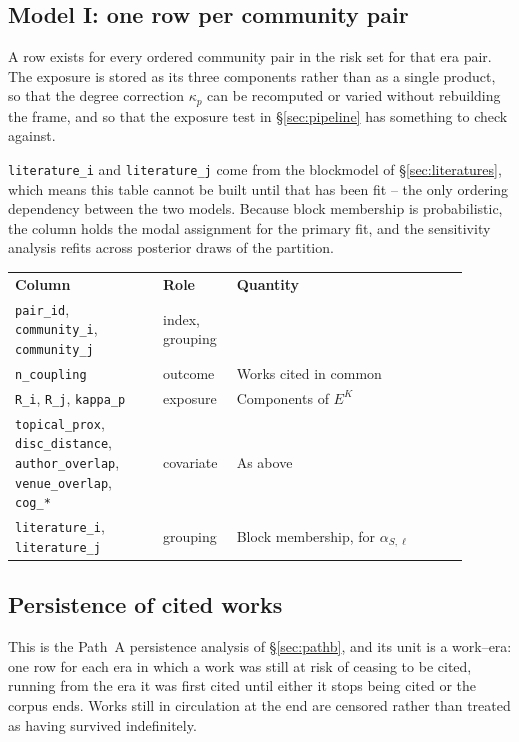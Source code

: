 \documentclass[11pt]{article}
\newcommand{\doublerule}{%
  \specialrule{\lightrulewidth}{0pt}{\doublerulesep}%
  \specialrule{\lightrulewidth}{0pt}{0pt}}
\newcommand{\code}[1]{\texttt{\small #1}}
\begin{document}
\subsection{Model I: one row per community pair}

A row exists for every ordered community pair in the risk set for that era pair. The exposure
is stored as its three components rather than as a single product, so that the degree
correction $\kappa_p$ can be recomputed or varied without rebuilding the frame, and so that
the exposure test in \S\ref{sec:pipeline} has something to check against.

\code{literature\_i} and \code{literature\_j} come from the blockmodel of
\S\ref{sec:literatures}, which means this table cannot be built until that has been fit --
the only ordering dependency between the two models. Because block membership is
probabilistic, the column holds the modal assignment for the primary fit, and the sensitivity
analysis refits across posterior draws of the partition.

\begin{center}
\small
\begin{tabular}{@{}>{\raggedright\arraybackslash}p{0.30\linewidth}>{\raggedright\arraybackslash}p{0.13\linewidth}>{\raggedright\arraybackslash}p{0.47\linewidth}@{}}
\toprule
\textbf{Column} & \textbf{Role} & \textbf{Quantity}\\
\doublerule
\code{pair\_id}, \code{community\_i}, \code{community\_j} & index, grouping & \\
\code{n\_coupling} & outcome & Works cited in common\\
\code{R\_i}, \code{R\_j}, \code{kappa\_p} & exposure & Components of $E^{K}$\\
\code{topical\_prox}, \code{disc\_distance}, \code{author\_overlap}, \code{venue\_overlap},
  \code{cog\_*} & covariate & As above\\
\code{literature\_i}, \code{literature\_j} & grouping & Block membership, for
  $\alpha_{S,\ell}$\\
\bottomrule
\end{tabular}
\end{center}

\subsection{Persistence of cited works}

This is the Path~A persistence analysis of \S\ref{sec:pathb}, and its unit is a
work--era: one row for each era in which a work was still at risk of ceasing to be cited,
running from the era it was first cited until either it stops being cited or the corpus ends.
Works still in circulation at the end are censored rather than treated as having survived
indefinitely.
\end{document}
